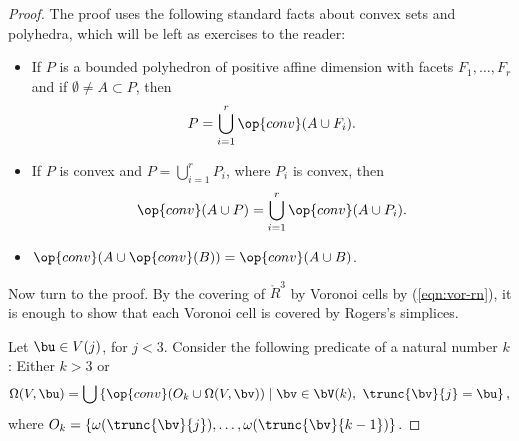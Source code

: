 \begin{proof}
The proof uses the following standard facts about convex sets and polyhedra, which will
be left as exercises to the reader:
\begin{itemize}
\item If $P$ is a bounded polyhedron of positive affine dimension with facets $F_1,\ldots,F_r$ and if $\emptyset\ne
A\subset P$,
then 
\begin{displaymath}
P = \bigcup_{i=1}^r \op{conv}(A\cup F_i).
\end{displaymath}
\item If $P$ is convex and $P = \bigcup_{i=1}^r P_i$, where $P_i$ is convex, then
\begin{displaymath}
\op{conv}(A\cup P ) = \bigcup_{i=1}^r\op{conv}(A\cup P_i).
\end{displaymath}
\item $\op{conv}(A\cup \op{conv}(B)) = \op{conv}(A \cup B)$.
\end{itemize}
%
Now turn to the proof.  
By the covering of $\ring{R}^3$  by Voronoi cells by (\ref{eqn:vor-rn}),
it is enough to show that each Voronoi cell is covered by Rogers's simplices.

Let $\bu\in V(j)$, for $j<3$.
Consider the following predicate of a natural number $k$: Either  $k>3$ or
\begin{displaymath}
\Omega(V,\bu) = \bigcup
\left\{\op{conv}(O_k \cup\Omega(V,\bv)) %
\mid
\bv \in \bV(k),~\trunc{\bv}{j}=\bu\right\},
\end{displaymath}
where $O_k = \{\omega(\trunc{\bv}{j}),\ldots,\omega(\trunc{\bv}{k-1})\}$.


\end{proof}
